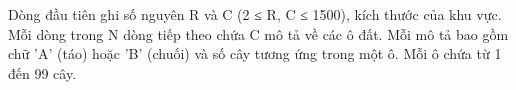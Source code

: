 Dòng đầu tiên ghi số nguyên R và C (2 ≤ R, C ≤ 1500), kích thước của khu vực. Mỗi dòng trong N dòng tiếp theo chứa C mô tả về các ô đất. Mỗi mô tả bao gồm chữ 'A' (táo) hoặc 'B' (chuối) và số cây tương ứng trong một ô. Mỗi ô chứa từ 1 đến 99 cây.